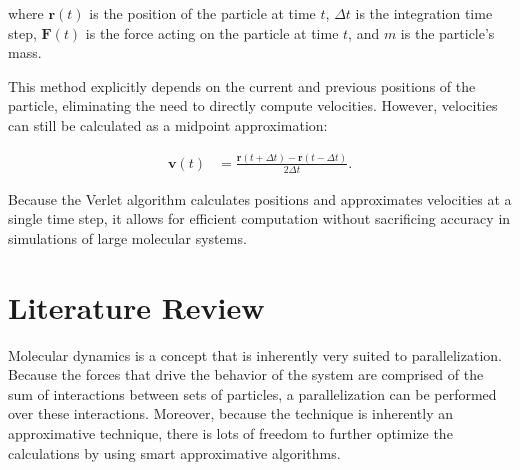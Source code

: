 \documentclass[conference]{IEEEtran}
\begin{document}
where \( \mathbf{r}(t) \) is the position of the particle at time \( t \), \( \Delta t \) is the integration time 
step, \( \mathbf{F}(t) \) is the force acting on the particle at time \( t \), and \( m \) is the particle's mass.

This method explicitly depends on the current and previous positions of the particle, eliminating the need to directly 
compute velocities. However, velocities can still be calculated as a midpoint approximation:

\begin{equation}
    \begin{aligned}
    \mathbf{v}(t) &= \frac{\mathbf{r}(t + \Delta t) - \mathbf{r}(t - \Delta t)}{2\Delta t}.
    \end{aligned}
\end{equation}



Because the Verlet algorithm calculates positions and approximates velocities at a single time step, it allows for 
efficient computation without sacrificing accuracy in simulations of large molecular systems.


\section{Literature Review}
    Molecular dynamics is a concept that is inherently very suited to parallelization. Because the forces that
    drive the behavior of the system are comprised of the sum of interactions between sets of particles, a parallelization
    can be performed over these interactions. Moreover, because the technique is inherently an approximative technique,
    there is lots of freedom to further optimize the calculations by using smart approximative algorithms. 
\end{document}
